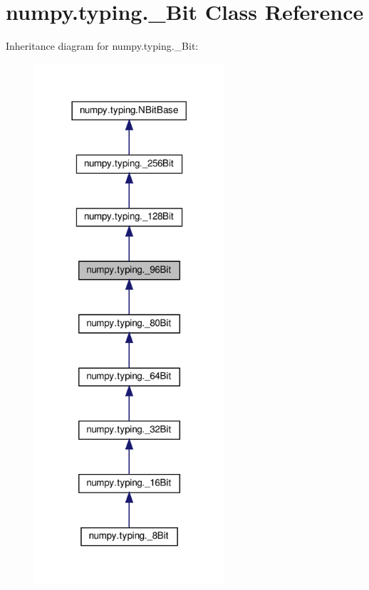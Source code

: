 \hypertarget{classnumpy_1_1typing_1_1__96Bit}{}\section{numpy.\+typing.\+\_\+Bit Class Reference}
\label{classnumpy_1_1typing_1_1__96Bit}


Inheritance diagram for numpy.\+typing.\+\_\+Bit\+:
\nopagebreak
\begin{figure}[H]
\begin{center}
\leavevmode
\includegraphics[width=200pt]{classnumpy_1_1typing_1_1__96Bit__inherit__graph}
\end{center}
\end{figure}


